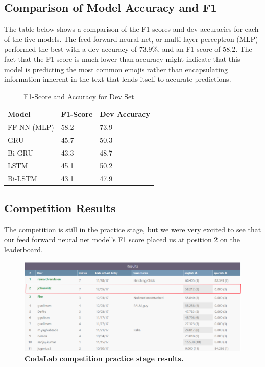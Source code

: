 \documentclass[11pt,a4paper]{article}
\begin{document}
\subsection{Comparison of Model Accuracy and F1}
The table below shows a comparison of the F1-scores and dev accuracies for each of the five models. The feed-forward neural net, or multi-layer perceptron (MLP) performed the best with a dev accuracy of 73.9\%, and an F1-score of 58.2. The fact that the F1-score is much lower than accuracy might indicate that this model is predicting the most common emojis rather than encapsulating information inherent in the text that lends itself to accurate predictions.
	\begin{table}[htp]
		\centering
		\caption{F1-Score and Accuracy for Dev Set}
		\label{my-label}
		\begin{tabular}{@{}lll@{}}
			\toprule
			Model       & F1-Score & Dev Accuracy \\ \midrule
			FF NN (MLP) & 58.2     & 73.9         \\
			GRU         & 45.7     & 50.3         \\
			Bi-GRU      & 43.3        & 48.7            \\
			LSTM        & 45.1     & 50.2         \\
			Bi-LSTM     & 43.1       & 47.9            \\ \bottomrule
		\end{tabular}
	\end{table}

\subsection{Competition Results}
The competition is still in the practice stage, but we were very excited to see that our feed forward neural net model's F1 score placed us at position 2 on the leaderboard.
\begin{figure}[H]
	\centering\includegraphics[scale=0.2]{leaderboard} 
	\caption{\textbf{ CodaLab competition practice stage results.}}
\end{figure}
\end{document}
